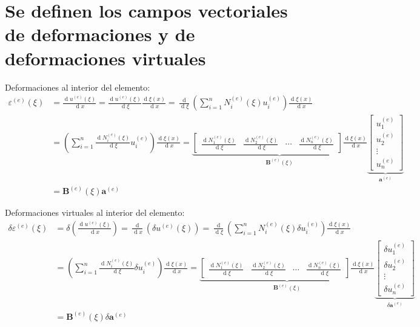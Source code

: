 \documentclass[12pt,letterpaper]{article}
\newcommand{\ve}[1]{{\boldsymbol{#1}}}
\newcommand{\ma}[1]{{\boldsymbol{#1}}}
\newcommand{\dd}{\operatorname{d} \!}
\begin{document}
\newpage

\section{Se definen los campos vectoriales de deformaciones y  de deformaciones virtuales}

Deformaciones al interior del elemento:
\begin{align}
\varepsilon^{(e)}(\xi) &= \frac{\dd u^{(e)}(\xi)}{\dd x} =
 \frac{\dd u^{(e)}(\xi)}{\dd \xi}\frac{\dd \xi(x)}{\dd x} = \frac{\dd}{\dd \xi}\left(\sum_{i=1}^n N_i^{(e)}(\xi) u_i^{(e)}\right)\frac{\dd \xi(x)}{\dd x} \\
 &= \left(\sum_{i=1}^n \frac{\dd N_i^{(e)}(\xi)}{\dd \xi} u_i^{(e)}\right) \frac{\dd \xi(x)}{\dd x} = 
\underbrace{\begin{bmatrix}
  \frac{\dd N_1^{(e)}(\xi)}{\dd \xi} & \frac{\dd N_2^{(e)}(\xi)}{\dd \xi} & \cdots & \frac{\dd N_n^{(e)}(\xi)}{\dd \xi}
   \end{bmatrix}\frac{\dd \xi(x)}{\dd x}}_{\ma{B}^{(e)}(\xi)}
\underbrace{\begin{bmatrix}
   u_1^{(e)} \\ u_2^{(e)} \\ \vdots \\ u_n^{(e)}
   \end{bmatrix}}_{\ma{a}^{(e)}} \\
&= \ma{B}^{(e)}(\xi)  \ve{a}^{(e)}
\end{align}

Deformaciones virtuales al interior del elemento:
\begin{align}
\delta \varepsilon^{(e)}(\xi) &= \delta \left(\frac{\dd u^{(e)}(\xi)}{\dd x}\right) = \frac{\dd}{\dd x}\left(\delta u^{(e)}(\xi)\right)
= \frac{\dd}{\dd \xi}\left(\sum_{i=1}^n N_i^{(e)}(\xi) \delta u_i^{(e)}\right)\frac{\dd \xi(x)}{\dd x} \\
&= \left(\sum_{i=1}^n \frac{\dd N_i^{(e)}(\xi)}{\dd \xi} \delta u_i^{(e)}\right)\frac{\dd \xi(x)}{\dd x} = 
\underbrace{\begin{bmatrix}
   \frac{\dd N_1^{(e)}(\xi)}{\dd \xi} & \frac{\dd N_2^{(e)}(\xi)}{\dd \xi} & \cdots & \frac{\dd N_n^{(e)}(\xi)}{\dd \xi}
   \end{bmatrix} \frac{\dd \xi(x)}{\dd x} }_{\ma{B}^{(e)}(\xi)}
\underbrace{\begin{bmatrix}
  \delta u_1^{(e)} \\ \delta u_2^{(e)} \\ \vdots \\ \delta u_n^{(e)} 
   \end{bmatrix}}_{\delta \ma{a}^{(e)}} \\
&= \ma{B}^{(e)}(\xi) \delta \ve{a}^{(e)}
\end{align}
\end{document}
